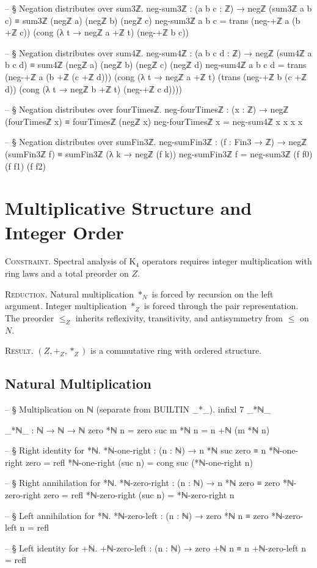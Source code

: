 \documentclass[11pt,a4paper]{book}
\def\mathbb#1{#1}%
\begin{document}
\begin{code}
-- § Negation distributes over sum3ℤ.
neg-sum3ℤ : (a b c : ℤ) → negℤ (sum3ℤ a b c) ≡ sum3ℤ (negℤ a) (negℤ b) (negℤ c)
neg-sum3ℤ a b c =
  trans (neg-+ℤ a (b +ℤ c))
        (cong (λ t → negℤ a +ℤ t) (neg-+ℤ b c))

-- § Negation distributes over sum4ℤ.
neg-sum4ℤ : (a b c d : ℤ) → negℤ (sum4ℤ a b c d) ≡ sum4ℤ (negℤ a) (negℤ b) (negℤ c) (negℤ d)
neg-sum4ℤ a b c d =
  trans
    (neg-+ℤ a (b +ℤ (c +ℤ d)))
    (cong (λ t → negℤ a +ℤ t)
          (trans
            (neg-+ℤ b (c +ℤ d))
            (cong (λ t → negℤ b +ℤ t) (neg-+ℤ c d))))

-- § Negation distributes over fourTimesℤ.
neg-fourTimesℤ : (x : ℤ) → negℤ (fourTimesℤ x) ≡ fourTimesℤ (negℤ x)
neg-fourTimesℤ x = neg-sum4ℤ x x x x

-- § Negation distributes over sumFin3ℤ.
neg-sumFin3ℤ : (f : Fin3 → ℤ) → negℤ (sumFin3ℤ f) ≡ sumFin3ℤ (λ k → negℤ (f k))
neg-sumFin3ℤ f = neg-sum3ℤ (f f0) (f f1) (f f2)
\end{code}

\chapter{Multiplicative Structure and Integer Order}

\textsc{Constraint.}
Spectral analysis of K$_4$ operators requires integer multiplication with ring laws
and a total preorder on $\mathbb{Z}$.

\textsc{Reduction.}
Natural multiplication $*_{\mathbb{N}}$ is forced by recursion on the left argument.
Integer multiplication $*_{\mathbb{Z}}$ is forced through the pair representation.
The preorder $\le_{\mathbb{Z}}$ inherits reflexivity, transitivity, and antisymmetry
from $\le$ on $\mathbb{N}$.

\textsc{Result.}
$(\mathbb{Z}, +_{\mathbb{Z}}, *_{\mathbb{Z}})$ is a commutative ring with ordered structure.

\section{Natural Multiplication}

\begin{code}
-- § Multiplication on ℕ (separate from BUILTIN _*_).
infixl 7 _*ℕ_

_*ℕ_ : ℕ → ℕ → ℕ
zero *ℕ n = zero
suc m *ℕ n = n +ℕ (m *ℕ n)

-- § Right identity for *ℕ.
*ℕ-one-right : (n : ℕ) → n *ℕ suc zero ≡ n
*ℕ-one-right zero = refl
*ℕ-one-right (suc n) = cong suc (*ℕ-one-right n)

-- § Right annihilation for *ℕ.
*ℕ-zero-right : (n : ℕ) → n *ℕ zero ≡ zero
*ℕ-zero-right zero = refl
*ℕ-zero-right (suc n) = *ℕ-zero-right n

-- § Left annihilation for *ℕ.
*ℕ-zero-left : (n : ℕ) → zero *ℕ n ≡ zero
*ℕ-zero-left n = refl

-- § Left identity for +ℕ.
+ℕ-zero-left : (n : ℕ) → zero +ℕ n ≡ n
+ℕ-zero-left n = refl
\end{code}
\end{document}
